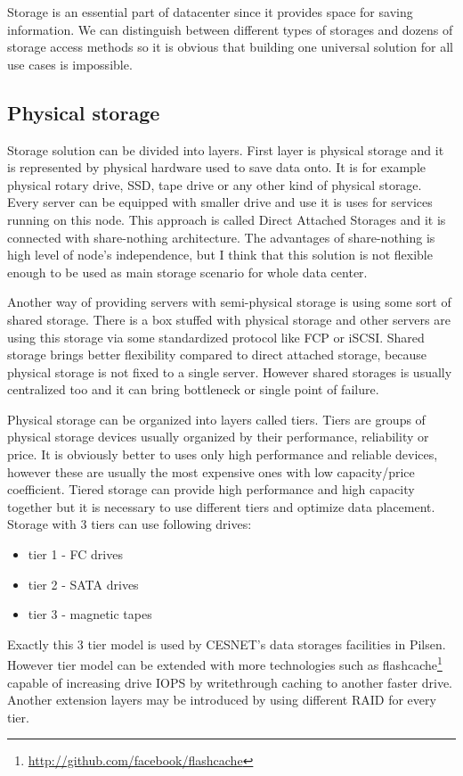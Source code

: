 

Storage is an essential part of datacenter since it provides space for saving information. We can distinguish between different types of storages and dozens of storage access methods so it is obvious that building one universal solution for all use cases is impossible. 

\subsection{Physical storage}
Storage solution can be divided into layers. First layer is physical storage and it is represented by physical hardware used to save data onto. It is for example physical rotary drive, \Ac{SSD}, tape drive or any other kind of physical storage. Every server can be equipped with smaller drive and use it is uses for services running on this node. This approach is called Direct Attached Storages and it is connected with share-nothing architecture. The advantages of share-nothing is high level of node's independence, but I think that this solution is not flexible enough to be used as main storage scenario for whole data center.

Another way of providing servers with semi-physical storage is using some sort of shared storage. There is a box stuffed with physical storage and other servers are using this storage via some standardized protocol like \Ac{FCP} or \Ac{iSCSI}. Shared storage brings better flexibility compared to direct attached storage, because physical storage is not fixed to a single server. However shared storages is usually centralized too and it can bring bottleneck or single point of failure.

Physical storage can be organized into layers called tiers. Tiers are groups of physical storage devices usually organized by their performance, reliability or price. It is obviously better to uses only high performance and reliable devices, however these are usually the most expensive ones with low capacity/price coefficient. Tiered storage can provide high performance and high capacity together but it is necessary to use different tiers and optimize data placement. Storage with 3 tiers can use following drives:
\begin{itemize}
	\item tier 1 - \Ac{FC} drives
	\item tier 2 - \Ac{SATA} drives
	\item tier 3 - magnetic tapes
\end{itemize}
Exactly this 3 tier model is used by CESNET's data storages facilities in Pilsen. However tier model can be extended with more technologies such as flashcache\footnote{\url{http://github.com/facebook/flashcache}} capable of increasing drive \Ac{IOPS} by writethrough caching to another faster drive. Another extension layers may be introduced by using different \Ac{RAID} for every tier.

